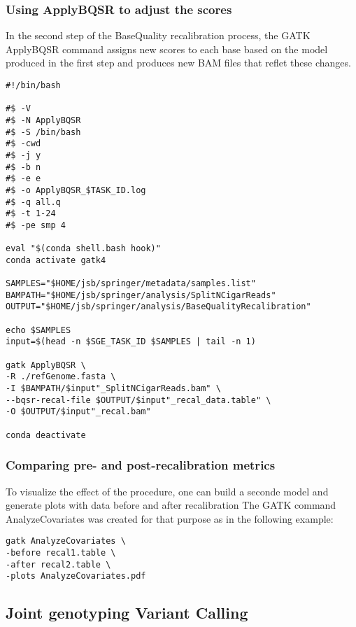 \subsubsection{Using ApplyBQSR to adjust the scores}

In the second step of the BaseQuality recalibration process, the GATK ApplyBQSR command assigns new scores to each base based on the model produced in the first step and produces new BAM files that reflet these changes.  


\begin{verbatim}
#!/bin/bash

#$ -V
#$ -N ApplyBQSR
#$ -S /bin/bash
#$ -cwd
#$ -j y
#$ -b n
#$ -e e
#$ -o ApplyBQSR_$TASK_ID.log
#$ -q all.q
#$ -t 1-24
#$ -pe smp 4

eval "$(conda shell.bash hook)"
conda activate gatk4

SAMPLES="$HOME/jsb/springer/metadata/samples.list"
BAMPATH="$HOME/jsb/springer/analysis/SplitNCigarReads"
OUTPUT="$HOME/jsb/springer/analysis/BaseQualityRecalibration"

echo $SAMPLES
input=$(head -n $SGE_TASK_ID $SAMPLES | tail -n 1)

gatk ApplyBQSR \
-R ./refGenome.fasta \
-I $BAMPATH/$input"_SplitNCigarReads.bam" \
--bqsr-recal-file $OUTPUT/$input"_recal_data.table" \
-O $OUTPUT/$input"_recal.bam"

conda deactivate
\end{verbatim}

\subsubsection{Comparing pre- and post-recalibration metrics}

To visualize the effect of the procedure, one can build a seconde model and generate plots with data before and after recalibration \cite{GATK_BaseQuality} The GATK command AnalyzeCovariates was created for that purpose as in the following example:

\begin{verbatim}
gatk AnalyzeCovariates \
-before recal1.table \
-after recal2.table \
-plots AnalyzeCovariates.pdf
\end{verbatim}



\subsection{Joint genotyping Variant Calling}


